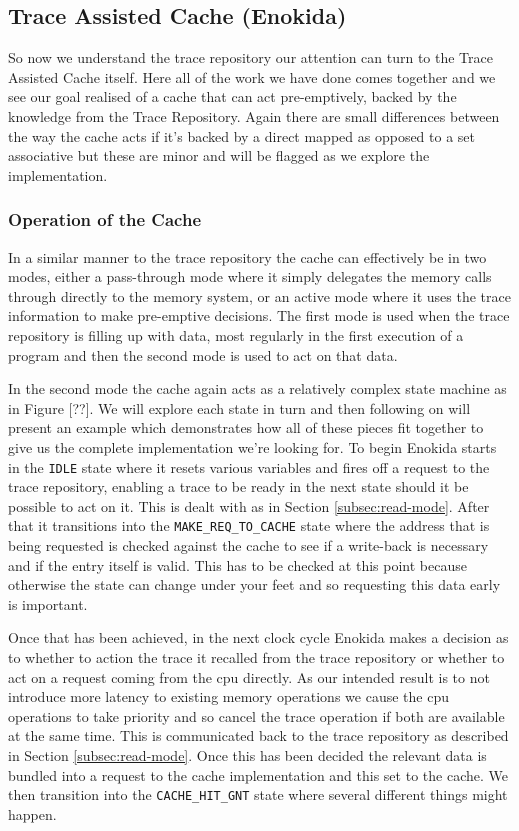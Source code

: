 \subsection{Trace Assisted Cache (Enokida)}

So now we understand the trace repository our attention can turn to the Trace Assisted Cache itself. Here all of the work we have done comes together and we see our goal realised of a cache that can act pre-emptively, backed by the knowledge from the Trace Repository. Again there are small differences between the way the cache acts if it's backed by a direct mapped as opposed to a set associative but these are minor and will be flagged as we explore the implementation.

\subsubsection{Operation of the Cache}

In a similar manner to the trace repository the cache can effectively be in two modes, either a pass-through mode where it simply delegates the memory calls through directly to the memory system, or an active mode where it uses the trace information to make pre-emptive decisions. The first mode is used when the trace repository is filling up with data, most regularly in the first execution of a program and then the second mode is used to act on that data. 

In the second mode the cache again acts as a relatively complex state machine as in Figure [??]. We will explore each state in turn and then following on will present an example which demonstrates how all of these pieces fit together to give us the complete implementation we're looking for. To begin Enokida starts in the \texttt{IDLE} state where it resets various variables and fires off a request to the trace repository, enabling a trace to be ready in the next state should it be possible to act on it. This is dealt with as in Section \ref{subsec:read-mode}. After that it transitions into the \texttt{MAKE\_REQ\_TO\_CACHE} state where the address that is being requested is checked against the cache to see if a write-back is necessary and if the entry itself is valid. This has to be checked at this point because otherwise the state can change under your feet and so requesting this data early is important. 

Once that has been achieved, in the next clock cycle Enokida makes a decision as to whether to action the trace it recalled from the trace repository or whether to act on a request coming from the \gls{cpu} directly. As our intended result is to not introduce more latency to existing memory operations we cause the \gls{cpu} operations to take priority and so cancel the trace operation if both are available at the same time. This is communicated back to the trace repository as described in Section \ref{subsec:read-mode}. Once this has been decided the relevant data is bundled into a request to the cache implementation and this set to the cache. We then transition into the \texttt{CACHE\_HIT\_GNT} state where several different things might happen. 

